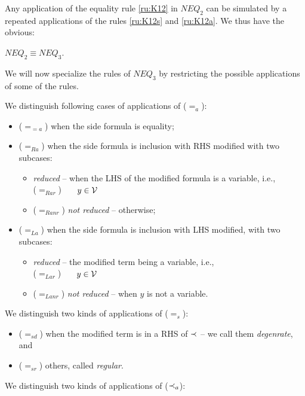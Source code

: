 \noindent
Any application of the equality rule \ref{ru:K12} in $NEQ_2$ can be simulated
by a repeated applications of the rules \ref{ru:K12s} and \ref{ru:K12a}. We
thus have the obvious:
\begin{LEMMA}\label{le:neq2isneq3}
 $NEQ_2 \equiv NEQ_3$.
\end{LEMMA}
%
\noindent
We will now specialize the rules of $NEQ_3$ by restricting the possible
applications of some of the rules.
%
\begin{DEFINITION}\label{de:eqALR}\label{de:eqSD}\label{de:inclad}\label{de:anr}
We distinguish following cases of applications of ($=_a$):
\begin{itemize}\MyLPar
\item ($=_{=a}$) when the side formula is equality;
\item ($=_{Ra}$) when the side formula is inclusion with RHS modified with
two subcases:
\begin{itemize}\MyLPar
\item {\em reduced} -- when the LHS of the modified formula is a
variable, i.e., \\
 ($=_{Rar}$)\ \  \ $y\in{\cal V}$
\item ($=_{Ranr}$) {\em not reduced} -- otherwise;
\end{itemize}
\item ($=_{La}$) when the side formula is inclusion with LHS modified, with
two subcases:
\begin{itemize}\MyLPar
\item {\em reduced} -- the modified term being a variable, i.e., \\
  ($=_{Lar}$) \ \ \ $y\in{\cal V}$
\item ($=_{Lanr}$) {\em not reduced} -- when $y$ is not a variable.
\end{itemize}
\end{itemize}
We distinguish two kinds of applications of ($=_s$):
\begin{itemize}\MyLPar
\item ($=_{sd}$)  when the modified term is in a RHS of $\mathbin{\prec}$ -- we call
them {\em degenrate}, and
\item ($=_{sr}$) others, called {\em regular}.
\end{itemize}
We distinguish two kinds of applications of ($\mathbin{\prec}_a$):

\end{DEFINITION}
